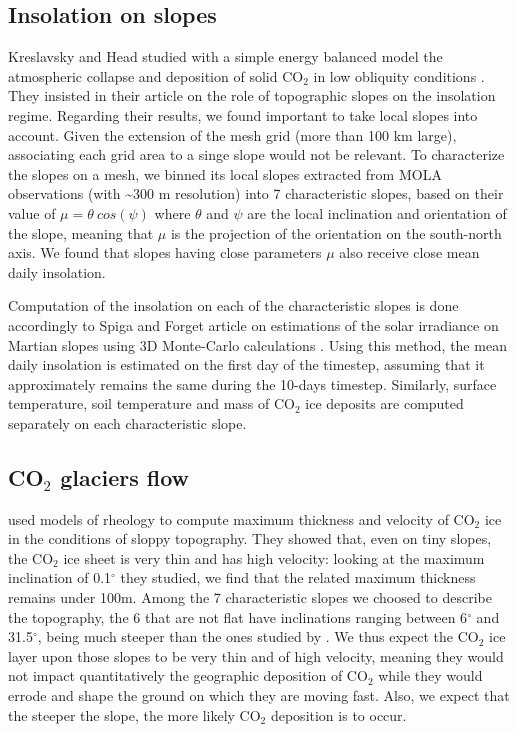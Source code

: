 \subsection{Insolation on slopes}
\label{sc:insolation_slopes}

Kreslavsky and Head studied with a simple energy balanced model the atmospheric collapse and 
deposition of solid CO$_2$ in low obliquity conditions \citep{Kres:05}. They insisted in their
article on the role of topographic slopes on the  insolation regime. Regarding 
their results, we found important to take local slopes into account. Given the extension of the 
mesh grid (more than 100 km large), associating each grid area to a singe slope would 
not be relevant. To characterize the slopes on a mesh, we binned its local slopes extracted from
MOLA observations (with \textasciitilde 300 m resolution) into 7 characteristic slopes, based on
their value of $\mu = \theta ~cos(\psi)$ where $\theta$ and $\psi$ are the local inclination and 
orientation of the slope, meaning that $\mu$ is the projection of the orientation on the 
south-north axis. We found that slopes having close parameters $\mu$ also receive close mean daily
insolation.

Computation of the insolation on each of the characteristic slopes is done accordingly to Spiga
and Forget article on estimations of the solar irradiance on Martian slopes using 3D Monte-Carlo
calculations \citep{Spig:08grl}. Using this method, the mean daily insolation is estimated on the
first day of the timestep, assuming that it approximately remains the same during the 10-days timestep.
Similarly, surface temperature, soil temperature and mass of CO$_2$ ice deposits are computed separately
on each characteristic slope. 


\subsection{CO$_2$ glaciers flow}
\label{sc:glaciers_flow}

\citep{Fast:17} used models of rheology to compute maximum thickness and velocity of CO$_2$ ice in
the conditions of sloppy topography. They showed that, even on tiny slopes, the CO$_2$ ice sheet is
very thin and has high velocity: looking at the maximum inclination of 0.1$^{\circ}$ they studied,
we find that the related maximum thickness remains under 100m.
Among the 7 characteristic slopes we choosed to describe the topography, the 6 that are not flat have
inclinations ranging between 6$^{\circ}$ and 31.5$^{\circ}$, being much steeper than the ones studied
by \citep{Fast:17}. We thus expect the CO$_2$ ice layer upon those slopes to be very thin and of
high velocity, meaning they would not impact quantitatively the geographic deposition of CO$_2$
while they would errode and shape the ground on which they are moving fast. Also, we expect that the
steeper the slope, the more likely CO$_2$ deposition is to occur.

